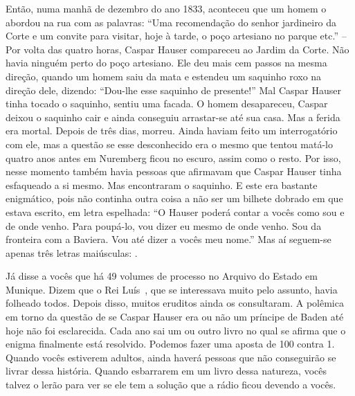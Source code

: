Então, numa manhã de dezembro do ano 1833, aconteceu que um homem o
abordou na rua com as palavras: ``Uma recomendação do senhor jardineiro
da Corte e um convite para visitar, hoje à tarde, o poço artesiano no
parque etc.'' -- Por volta das quatro horas, Caspar Hauser compareceu ao
Jardim da Corte. Não havia ninguém perto do poço artesiano. Ele deu mais
cem passos na mesma direção, quando um homem saiu da mata e estendeu um
saquinho roxo na direção dele, dizendo: ``Dou-lhe esse saquinho de
presente!'' Mal Caspar Hauser tinha tocado o saquinho, sentiu uma
facada. O homem desapareceu, Caspar deixou o saquinho cair e ainda
conseguiu arrastar-se até sua casa. Mas a ferida era mortal. Depois de
três dias, morreu. Ainda haviam feito um interrogatório com ele, mas a
questão se esse desconhecido era o mesmo que tentou matá-lo quatro anos
antes em Nuremberg ficou no escuro, assim como o resto. Por isso, nesse
momento também havia pessoas que afirmavam que Caspar Hauser tinha
esfaqueado a si mesmo. Mas encontraram o saquinho. E este era bastante
enigmático, pois não continha outra coisa a não ser um bilhete dobrado
em que estava escrito, em letra espelhada: ``O Hauser poderá contar a
vocês como sou e de onde venho. Para poupá-lo, vou dizer eu mesmo de
onde venho. Sou da fronteira com a Baviera. Vou até dizer a vocês meu
nome.'' Mas aí seguem-se apenas três letras maiúsculas: .

Já disse a vocês que há 49 volumes de processo no Arquivo do Estado em
Munique. Dizem que o Rei Luís~, que se interessava muito pelo assunto,
havia folheado todos. Depois disso, muitos eruditos ainda os
consultaram. A polêmica em torno da questão de se Caspar Hauser era ou não
um príncipe de Baden até hoje não foi esclarecida. Cada ano sai um ou
outro livro no qual se afirma que o enigma finalmente está resolvido.
Podemos fazer uma aposta de 100 contra 1. Quando vocês estiverem
adultos, ainda haverá pessoas que não conseguirão se livrar dessa
história. Quando esbarrarem em um livro dessa natureza, vocês talvez o
lerão para ver se ele tem a solução que a rádio ficou devendo a vocês.




